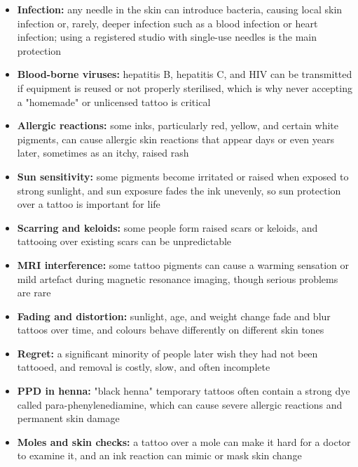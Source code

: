 \begin{itemize}
    \item \textbf{Infection:} any needle in the skin can introduce bacteria, causing local skin infection or, rarely, deeper infection such as a blood infection or heart infection; using a registered studio with single-use needles is the main protection
    \item \textbf{Blood-borne viruses:} hepatitis B, hepatitis C, and HIV can be transmitted if equipment is reused or not properly sterilised, which is why never accepting a "homemade" or unlicensed tattoo is critical
    \item \textbf{Allergic reactions:} some inks, particularly red, yellow, and certain white pigments, can cause allergic skin reactions that appear days or even years later, sometimes as an itchy, raised rash
    \item \textbf{Sun sensitivity:} some pigments become irritated or raised when exposed to strong sunlight, and sun exposure fades the ink unevenly, so sun protection over a tattoo is important for life
    \item \textbf{Scarring and keloids:} some people form raised scars or keloids, and tattooing over existing scars can be unpredictable
    \item \textbf{MRI interference:} some tattoo pigments can cause a warming sensation or mild artefact during magnetic resonance imaging, though serious problems are rare
    \item \textbf{Fading and distortion:} sunlight, age, and weight change fade and blur tattoos over time, and colours behave differently on different skin tones
    \item \textbf{Regret:} a significant minority of people later wish they had not been tattooed, and removal is costly, slow, and often incomplete
    \item \textbf{PPD in henna:} "black henna" temporary tattoos often contain a strong dye called para-phenylenediamine, which can cause severe allergic reactions and permanent skin damage
    \item \textbf{Moles and skin checks:} a tattoo over a mole can make it hard for a doctor to examine it, and an ink reaction can mimic or mask skin change
\end{itemize}

